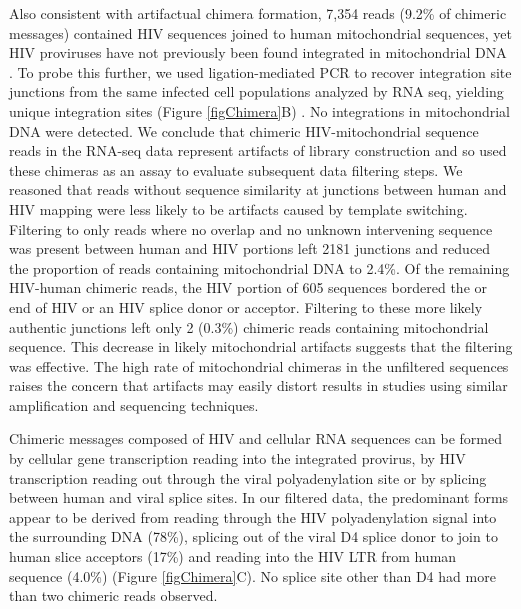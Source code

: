 \documentclass[../sherrill-Mix_thesis.tex]{subfiles}
\begin{document}
		Also consistent with artifactual chimera formation, 7,354 reads (9.2\%  of chimeric messages) contained HIV sequences joined to human mitochondrial sequences, yet HIV proviruses have not previously been found integrated in mitochondrial DNA \citep{Wang2007}. To probe this further, we used ligation-mediated PCR to recover integration site junctions from the same infected cell populations analyzed by RNA seq, yielding \nIntegrations{} unique integration sites (Figure \ref{figChimera}B) \citep{Berry2014}.  No integrations in mitochondrial DNA were detected. We conclude that chimeric HIV-mitochondrial sequence reads in the RNA-seq data represent artifacts of library construction and so used these chimeras as an assay to evaluate subsequent data filtering steps.  We reasoned that reads without sequence similarity at junctions between human and HIV mapping were less likely to be artifacts caused by template switching. Filtering to only reads where no overlap and no unknown intervening sequence was present between human and HIV portions left 2181 junctions and reduced the proportion of reads containing mitochondrial DNA to 2.4\%. Of the remaining HIV-human chimeric reads, the HIV portion of 605 sequences bordered the \threePrime{} or \fivePrime{} end of HIV or an HIV splice donor or acceptor. Filtering to these more likely authentic junctions left only 2 (0.3\%) chimeric reads containing mitochondrial sequence. This decrease in likely mitochondrial artifacts suggests that the filtering was effective. The high rate of mitochondrial chimeras in the unfiltered sequences raises the concern that artifacts may easily distort results in studies using similar amplification and sequencing techniques.

		Chimeric messages composed of HIV and cellular RNA sequences can be formed by cellular gene transcription reading into the integrated provirus, by HIV transcription reading out through the viral polyadenylation site or by splicing between human and viral splice sites. In our filtered data, the predominant forms appear to be derived from reading through the HIV polyadenylation signal into the surrounding DNA (78\%), splicing out of the viral D4 splice donor to join to human slice acceptors (17\%) and reading into the HIV \fivePrime{} LTR from human sequence (4.0\%) (Figure \ref{figChimera}C). No splice site other than D4 had more than two chimeric reads observed. 
		
\end{document}

